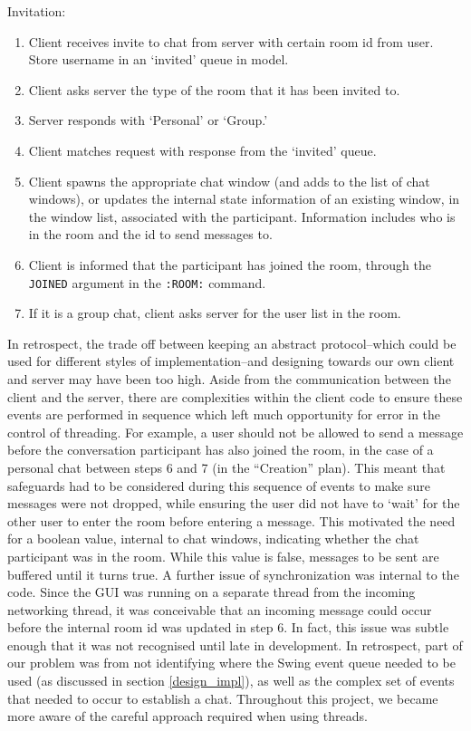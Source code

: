 Invitation:
\begin{enumerate}
\item Client receives invite to chat from server with certain room id from user. Store username in an `invited' queue in model.  
\item Client asks server the type of the room that it has been invited to.
\item Server responds with `Personal' or `Group.'
\item Client matches request with response from the `invited' queue.
\item Client spawns the appropriate chat window (and adds to the list of chat windows), or updates the internal state information of an existing window, in the window list, associated with the participant. Information includes who is in the room and the id to send messages to.
\item Client is informed that the participant has joined the room, through the \texttt{JOINED} argument in the \texttt{:ROOM:} command.
\item If it is a group chat, client asks server for the user list in the room.
\end{enumerate}

In retrospect, the trade off between keeping an abstract protocol--which could be used for different styles of implementation--and designing towards our own client and server may have been too high. Aside from the communication between the client and the server, there are complexities within the client code to ensure these events are performed in sequence which left much opportunity for error in the control of threading. For example, a user should not be allowed to send a message before the conversation participant has also joined the room, in the case of a personal chat between steps 6 and 7 (in the ``Creation'' plan). This meant that safeguards had to be considered during this sequence of events to make sure messages were not dropped, while ensuring the user did not have to `wait' for the other user to enter the room before entering a message. This motivated the need for a boolean value, internal to chat windows, indicating whether the chat participant was in the room. While this value is false, messages to be sent are buffered until it turns true. A further issue of synchronization was internal to the code. Since the GUI was running on a separate thread from the incoming networking thread, it was conceivable that an incoming message could occur before the internal room id was updated in step 6. In fact, this issue was subtle enough that it was not recognised until late in development. In retrospect, part of our problem was from not identifying where the Swing event queue needed to be used (as discussed in section \ref{design_impl}), as well as the complex set of events that needed to occur to establish a chat. Throughout this project, we became more aware of the careful approach required when using threads. 


